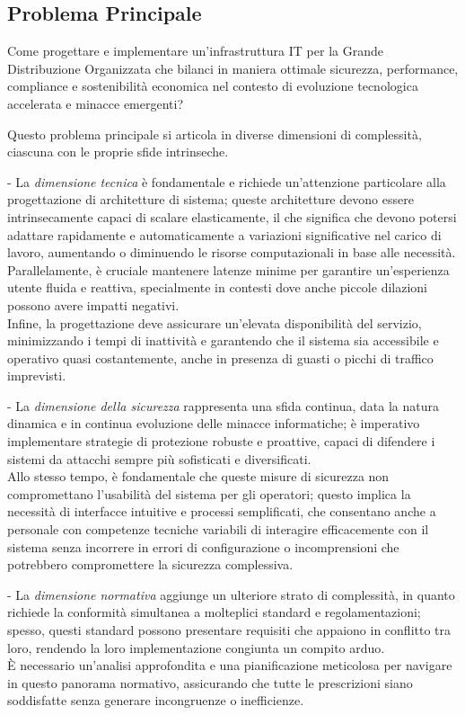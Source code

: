 \documentclass{report}
\begin{document}
\subsection{\texorpdfstring{\textbf{Problema
Principale}}{1.2.1 Problema Principale}}\label{problema-principale}

Come progettare e implementare un'infrastruttura IT per la Grande
Distribuzione Organizzata che bilanci in maniera ottimale sicurezza,
performance, compliance e sostenibilità economica nel contesto di
evoluzione tecnologica accelerata e minacce emergenti?

Questo problema principale si articola in diverse dimensioni di
complessità, ciascuna con le proprie sfide intrinseche.

- La \emph{dimensione tecnica} è fondamentale e richiede un'attenzione
particolare alla progettazione di architetture di sistema; queste
architetture devono essere intrinsecamente capaci di scalare
elasticamente, il che significa che devono potersi adattare rapidamente
e automaticamente a variazioni significative nel carico di lavoro,
aumentando o diminuendo le risorse computazionali in base alle
necessità.\\
Parallelamente, è cruciale mantenere latenze minime per garantire
un'esperienza utente fluida e reattiva, specialmente in contesti dove
anche piccole dilazioni possono avere impatti negativi.\\
Infine, la progettazione deve assicurare un'elevata disponibilità del
servizio, minimizzando i tempi di inattività e garantendo che il sistema
sia accessibile e operativo quasi costantemente, anche in presenza di
guasti o picchi di traffico imprevisti.

- La \emph{dimensione della sicurezza} rappresenta una sfida continua,
data la natura dinamica e in continua evoluzione delle minacce
informatiche; è imperativo implementare strategie di protezione robuste
e proattive, capaci di difendere i sistemi da attacchi sempre più
sofisticati e diversificati.\\
Allo stesso tempo, è fondamentale che queste misure di sicurezza non
compromettano l'usabilità del sistema per gli operatori; questo implica
la necessità di interfacce intuitive e processi semplificati, che
consentano anche a personale con competenze tecniche variabili di
interagire efficacemente con il sistema senza incorrere in errori di
configurazione o incomprensioni che potrebbero compromettere la
sicurezza complessiva.

- La \emph{dimensione normativa} aggiunge un ulteriore strato di
complessità, in quanto richiede la conformità simultanea a molteplici
standard e regolamentazioni; spesso, questi standard possono presentare
requisiti che appaiono in conflitto tra loro, rendendo la loro
implementazione congiunta un compito arduo.\\
È necessario un'analisi approfondita e una pianificazione meticolosa per
navigare in questo panorama normativo, assicurando che tutte le
prescrizioni siano soddisfatte senza generare incongruenze o
inefficienze.
\end{document}
